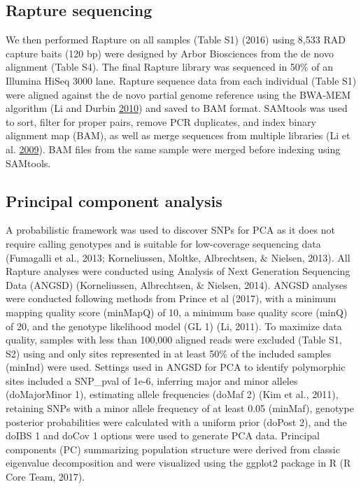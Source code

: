 \documentclass[proquest,12pt,final]{ucthesis-CA2012} %
\begin{document}
\begin{ucmainmatter}
\hypertarget{rapture-sequencing}{%
\subsection{Rapture sequencing}\label{rapture-sequencing}}

We then performed Rapture on all samples (Table S1) (2016) using 8,533
RAD capture baits (120 bp) were designed by Arbor Biosciences from the
de novo alignment (Table S4). The final Rapture library was sequenced in
50\% of an Illumina HiSeq 3000 lane. Rapture sequence data from each
individual (Table S1) were aligned against the de novo partial genome
reference using the BWA-MEM algorithm (Li and Durbin
\protect\hyperlink{ref-li_fast_2010}{2010}) and saved to BAM format.
SAMtools was used to sort, filter for proper pairs, remove PCR
duplicates, and index binary alignment map (BAM), as well as merge
sequences from multiple libraries (Li et al.
\protect\hyperlink{ref-li_sequence_2009}{2009}). BAM files from the same
sample were merged before indexing using SAMtools.

\hypertarget{principal-component-analysis}{%
\subsection{Principal component
analysis}\label{principal-component-analysis}}

A probabilistic framework was used to discover SNPs for PCA as it does
not require calling genotypes and is suitable for low-coverage
sequencing data (Fumagalli et al., 2013; Korneliussen, Moltke,
Albrechtsen, \& Nielsen, 2013). All Rapture analyses were conducted
using Analysis of Next Generation Sequencing Data (ANGSD) (Korneliussen,
Albrechtsen, \& Nielsen, 2014). ANGSD analyses were conducted following
methods from Prince et al (2017), with a minimum mapping quality score
(minMapQ) of 10, a minimum base quality score (minQ) of 20, and the
genotype likelihood model (GL 1) (Li, 2011). To maximize data quality,
samples with less than 100,000 aligned reads were excluded (Table S1,
S2) using and only sites represented in at least 50\% of the included
samples (minInd) were used. Settings used in ANGSD for PCA to identify
polymorphic sites included a SNP\_pval of 1e-6, inferring major and
minor alleles (doMajorMinor 1), estimating allele frequencies (doMaf 2)
(Kim et al., 2011), retaining SNPs with a minor allele frequency of at
least 0.05 (minMaf), genotype posterior probabilities were calculated
with a uniform prior (doPost 2), and the doIBS 1 and doCov 1 options
were used to generate PCA data. Principal components (PC) summarizing
population structure were derived from classic eigenvalue decomposition
and were visualized using the ggplot2 package in R (R Core Team, 2017).


\end{ucmainmatter}
\end{document}

